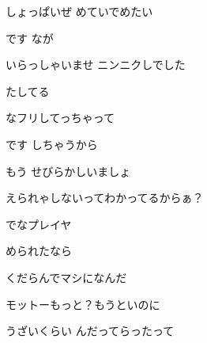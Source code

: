 \documentclass[a4paper,tate,twocolumn,12pt]{ltjtarticle}
\begin{document}
\thispagestyle{empty}

\begin{center}
{\LARGE {}}
\end{center}

\vspace{1em}

\begin{flushleft}

\noindent\begin{minipage}{\linewidth}
しょっぱいぜ めていでめたい

です なが

いらっしゃいませ ニンニクしでした

たしてる
\end{minipage}

\vspace{1em}

\noindent\begin{minipage}{\linewidth}
 なフリしてっちゃって

です しちゃうから

もう せびらかしいましょ

えられゃしないってわかってるからぁ？
\end{minipage}

\vspace{2em}

\noindent\begin{minipage}{\linewidth}
でなプレイヤ

められたなら

くだらんでマシになんだ

モットーもっと？もうといのに
\end{minipage}

\vspace{2em}

\noindent\begin{minipage}{\linewidth}
うざいくらい んだってらったって


\end{minipage}
\end{flushleft}
\end{document}
